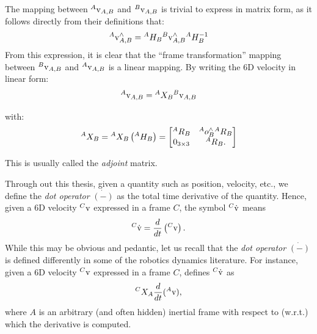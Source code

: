 The mapping between $\hspace{0em}^A {\rm v}_{A,B}$ and  $\hspace{0em}^B {\rm v}_{A,B}$ is trivial to express in matrix form, as it follows directly from their definitions that:
$$
\hspace{0em}^A {\rm v}_{A,B}^\wedge = \hspace{0em}^A H_B \hspace{0em}^B {\rm v}_{A,B}^\wedge \hspace{0em}^A H_B^{-1}
$$
From this expression, it is clear that the ``frame transformation'' mapping between $\hspace{0em}^B {\rm v}_{A,B}$ and  $\hspace{0em}^A {\rm v}_{A,B}$ is a linear mapping. By writing the 6D velocity in linear form:
$$
\hspace{0em}^A {\rm v}_{A,B} = \hspace{0em}^A X_B \hspace{0em}^B {\rm v}_{A,B} 
$$

with:
\begin{equation}
\label{eq:adjTransform}
\hspace{0em}^A X_B = \hspace{0em}^A X_B \left( \hspace{0em}^A H_B \right) = 
\begin{bmatrix}
\hspace{0em}^A R_B &  \hspace{0em}^A o_B^\wedge \hspace{0em}^A R_B \\
0_{3 \times 3} & \hspace{0em}^A R_B .
\end{bmatrix}
\end{equation}

This is usually called the \emph{adjoint} matrix.

\begin{remark}
\label{rem:dotNotation}
Through out this thesis, given a quantity such as position, velocity, etc., we define the \emph{dot operator} $\dot{(-)}$  as the total time derivative of the quantity. Hence, given a 6D velocity $\hspace{0em}^C {\rm v}$ expressed in a frame $C$, the symbol $\hspace{0em}^C \dot{{\rm v}}$ means
\begin{equation*}
\hspace{0em}^C \dot{{\rm v}} = \frac{d}{dt}\left(\hspace{0em}^C{\rm v}\right).
\end{equation*}
While this may be obvious and pedantic, let us recall that the  \emph{ dot operator} $\dot{(-)}$ is defined differently in some of the robotics dynamics literature. For instance, given a 6D velocity $\hspace{0em}^C {\rm v}$ expressed in a frame $C$, \cite[Section 2.10]{featherstone2008} defines $\hspace{0em}^C \dot{{\rm v}}$ as
\begin{equation*}
    \hspace{0em}^C X_A \frac{d}{dt}(\hspace{0em}^A {\rm v}),
\end{equation*}
where $A$ is an arbitrary (and often hidden) inertial frame with respect to (w.r.t.) which the derivative is computed.
\end{remark}


